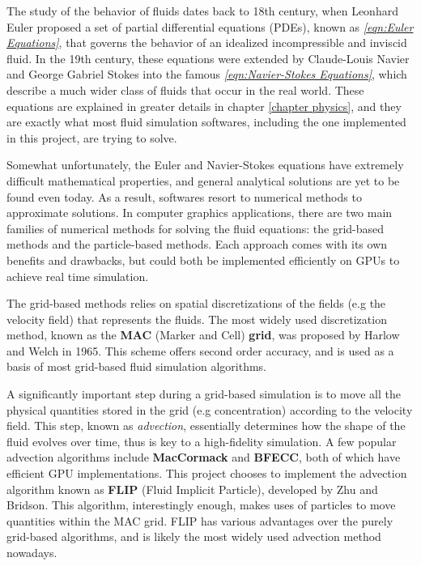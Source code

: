 The study of the behavior of fluids dates back to 18th century, when Leonhard Euler proposed a set of partial differential equations (PDEs), known as \textit{\ref{eqn:Euler Equations}}, that governs the behavior of an idealized incompressible and inviscid fluid. In the 19th century, these equations were extended by Claude-Louis Navier and George Gabriel Stokes into the famous \textit{\ref{eqn:Navier-Stokes Equations}}, which describe a much wider class of fluids that occur in the real world. These equations are explained in greater details in chapter \ref{chapter physics}, and they are exactly what most fluid simulation softwares, including the one implemented in this project, are trying to solve. 

Somewhat unfortunately, the Euler and Navier-Stokes equations have extremely difficult mathematical properties, and general analytical solutions are yet to be found even today. As a result, softwares resort to numerical methods to approximate solutions. In computer graphics applications, there are two main families of numerical methods for solving the fluid equations: the grid-based methods and the particle-based methods. Each approach comes with its own benefits and drawbacks, but could both be implemented efficiently on GPUs to achieve real time simulation.

The grid-based methods relies on spatial discretizations of the fields (e.g the velocity field) that represents the fluids. The most widely used discretization method, known as the \textbf{MAC} (Marker and Cell) \textbf{grid}, was proposed by Harlow and Welch \cite{harlow1965numerical} in 1965. This scheme offers second order accuracy, and is used as a basis of most grid-based fluid simulation algorithms. 

A significantly important step during a grid-based simulation is to move all the physical quantities stored in the grid (e.g concentration) according to the velocity field. This step, known as \textit{advection}, essentially determines how the shape of the fluid evolves over time, thus is key to a high-fidelity simulation. A few popular advection algorithms include \textbf{MacCormack}\cite{selle2008unconditionally} and \textbf{BFECC}\cite{kim2005flowfixer}, both of which have efficient GPU implementations\cite{chentanez2011real}\cite{xu2011interactive}. This project chooses to implement the advection algorithm known as \textbf{FLIP} (Fluid Implicit Particle)\cite{zhu2005animating}, developed by Zhu and Bridson. This algorithm, interestingly enough, makes uses of particles to move quantities within the MAC grid. FLIP has various advantages over the purely grid-based algorithms, and is likely the most widely used advection method nowadays. 

